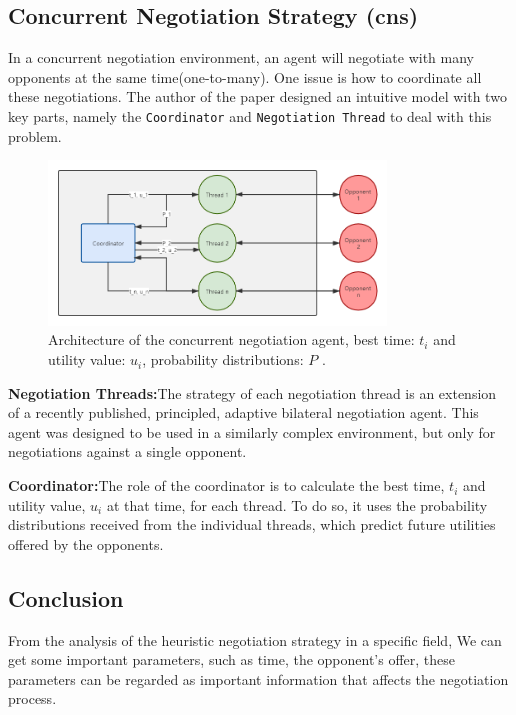 \subsection{Concurrent Negotiation Strategy (\gls{cns})}
In a concurrent negotiation environment, an agent will negotiate with many opponents at the same time(one-to-many). One issue is how to coordinate all these negotiations. The author of the paper \parencite{Williams12Concurrent} designed an intuitive model with two key parts, namely the \texttt{Coordinator} and \texttt{Negotiation Thread} to deal with this problem.

\begin{figure}[htbp]
\centering
\includegraphics[width=0.8\textwidth]{./images/heuristic_concurrent_negotiation.png}
\caption{Architecture of the concurrent negotiation agent, best time: $t_i$ and utility value: $u_i$, probability distributions: $P$ \parencite{Williams12Concurrent}.}
\label{fig:heuristic-concurrent-negotiation}
\end{figure}

\textbf{Negotiation Threads:}The strategy of each negotiation thread is an extension of a recently published, principled, adaptive bilateral negotiation agent. This agent was designed to be used in a similarly complex environment, but only for negotiations against a single opponent.

\textbf{Coordinator:}The role of the coordinator is to calculate the best time, $t_i$ and utility value, $u_i$ at that time, for each thread. To do so, it uses the probability distributions received from the individual threads, which predict future utilities offered by the opponents.

\subsection{Conclusion}
From the analysis of the heuristic negotiation strategy in a specific field, We can get some important parameters, such as time, the opponent's offer, these parameters can be regarded as important information that affects the negotiation process.

